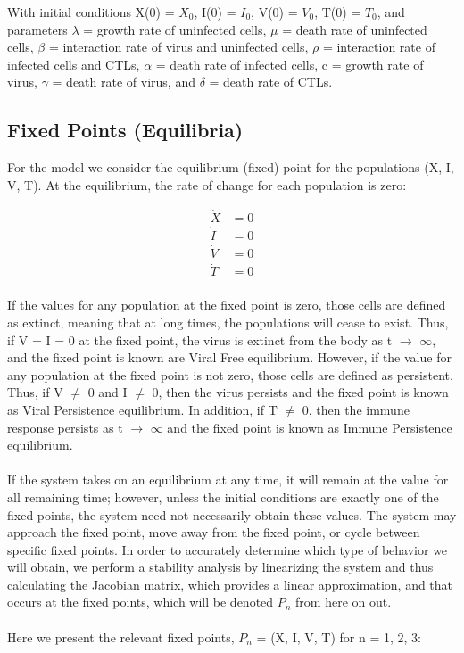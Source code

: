 \documentclass{article}
\begin{document}
With initial conditions X(0) = $X_{0}$, I(0) = $I_{0}$, V(0) = $V_{0}$, T(0) = $T_{0}$, and parameters $\lambda$ = growth rate of uninfected cells, $\mu$ = death rate of uninfected cells, $\beta$ = interaction rate of virus and uninfected cells, $\rho$ = interaction rate of infected cells and CTLs, $\alpha$ = death rate of infected cells, c = growth rate of virus, $\gamma$ = death rate of virus, and $\delta$ = death rate of CTLs.

\subsection{Fixed Points (Equilibria)}

For the model we consider the equilibrium (fixed) point for the populations (X, I, V, T). At the equilibrium, the rate of change for each population is zero:

\begin{equation}
	\begin{split}
		\dot X &= 0 \\
		\dot I &= 0 \\
		\dot V &= 0 \\
		\dot T &= 0 \\
	\end{split}
\end{equation}

If the values for any population at the fixed point is zero, those cells are defined as extinct, meaning that at long times, the populations will cease to exist. Thus, if V = I = 0 at the fixed point, the virus is extinct from the body as t $\rightarrow$ $\infty$, and the fixed point is known are Viral Free equilibrium. However, if the value for any population at the fixed point is not zero, those cells are defined as persistent. Thus, if V $\neq$ 0 and I $\neq$ 0, then the virus persists and the fixed point is known as Viral Persistence equilibrium. In addition, if T $\neq$ 0, then the immune response persists as t $\rightarrow$ $\infty$ and the fixed point is known as Immune Persistence equilibrium.\\
\\
If the system takes on an equilibrium at any time, it will remain at the value for all remaining time; however, unless the initial conditions are exactly one of the fixed points, the system need not necessarily obtain these values. The system may approach the fixed point, move away from the fixed point, or cycle between specific fixed points. In order to accurately determine which type of behavior we will obtain, we perform a stability analysis by linearizing the system and thus calculating the Jacobian matrix, which provides a linear approximation, and that occurs at the fixed points, which will be denoted $P_{n}$ from here on out.\\
\\
Here we present the relevant fixed points, $P_{n}$ = (X, I, V, T) for n = 1, 2, 3:
\end{document}
